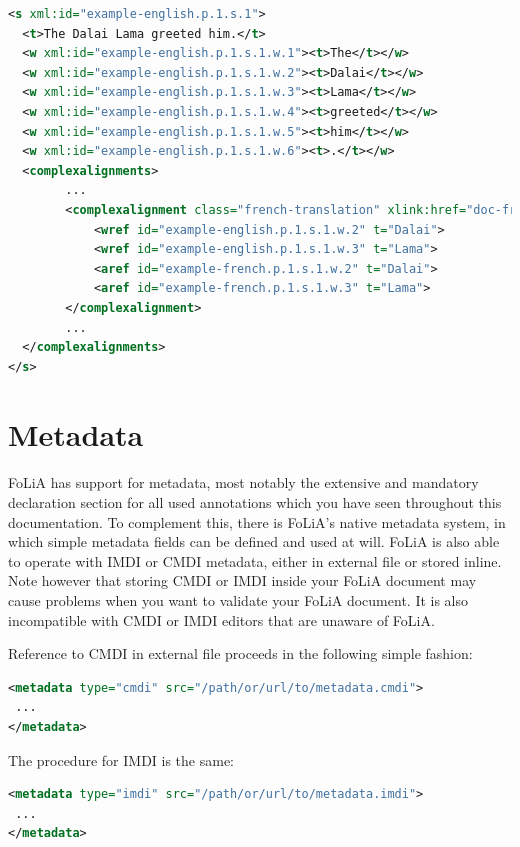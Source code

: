 \documentclass[a4paper,12pt]{report}
\begin{document}
\begin{lstlisting}[language=xml]
<s xml:id="example-english.p.1.s.1">
  <t>The Dalai Lama greeted him.</t>
  <w xml:id="example-english.p.1.s.1.w.1"><t>The</t></w>
  <w xml:id="example-english.p.1.s.1.w.2"><t>Dalai</t></w>
  <w xml:id="example-english.p.1.s.1.w.3"><t>Lama</t></w>
  <w xml:id="example-english.p.1.s.1.w.4"><t>greeted</t></w>
  <w xml:id="example-english.p.1.s.1.w.5"><t>him</t></w>
  <w xml:id="example-english.p.1.s.1.w.6"><t>.</t></w>
  <complexalignments>
        ...
        <complexalignment class="french-translation" xlink:href="doc-french.xml" xlink:type="simple">
            <wref id="example-english.p.1.s.1.w.2" t="Dalai">
            <wref id="example-english.p.1.s.1.w.3" t="Lama">
            <aref id="example-french.p.1.s.1.w.2" t="Dalai">
            <aref id="example-french.p.1.s.1.w.3" t="Lama">
        </complexalignment>
        ...
  </complexalignments>
</s>
\end{lstlisting}




\section{Metadata}

FoLiA has support for metadata, most notably the extensive and mandatory declaration section for all used annotations which you have seen throughout this documentation. To complement this, there is FoLiA's native metadata system, in which simple metadata fields can be defined and used at will. FoLiA is also able to operate with IMDI or CMDI metadata, either in external file or stored inline. Note however that storing CMDI or IMDI inside your FoLiA document may cause problems when you want to validate your FoLiA document. It is also incompatible with CMDI or IMDI editors that are unaware of FoLiA.

Reference to CMDI in external file proceeds in the following simple fashion:

\begin{lstlisting}[language=xml]
<metadata type="cmdi" src="/path/or/url/to/metadata.cmdi">
 ...
</metadata>
\end{lstlisting}

The procedure for IMDI is the same:

\begin{lstlisting}[language=xml]
<metadata type="imdi" src="/path/or/url/to/metadata.imdi">
 ...
</metadata>
\end{lstlisting}
\end{document}
